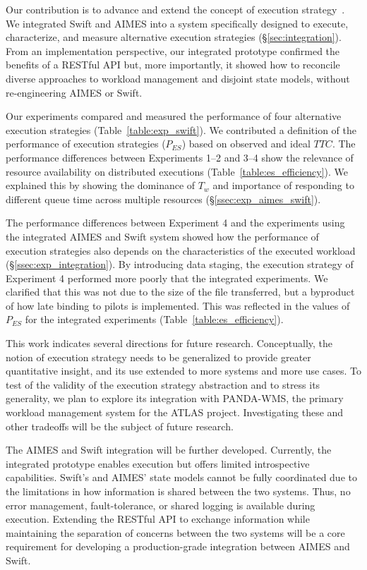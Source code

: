 \documentclass[10pt, conference, compsocconf]{IEEEtran}
\begin{document}
Our contribution is to advance and extend the concept of execution
strategy~\cite{turilli2016integrating}.  We integrated Swift and AIMES into a
system specifically designed to execute, characterize, and measure
alternative execution strategies (\S\ref{sec:integration}). From an
implementation perspective, our integrated prototype confirmed the benefits
of a RESTful API but, more importantly, it showed how to reconcile diverse
approaches to workload management and disjoint state models, without
re-engineering AIMES or Swift.

Our experiments compared and measured the performance of four alternative
execution strategies (Table~\ref{table:exp_swift}). We contributed a
definition of the performance of execution strategies (\(P_{ES}\)) based on
observed and ideal \(TTC\). The performance differences between Experiments
1--2 and 3--4 show the relevance of resource availability on distributed
executions (Table~\ref{table:es_efficiency}).  We explained this by showing
the dominance of \(T_w\) and importance of responding to different queue time
across multiple resources (\S\ref{ssec:exp_aimes_swift}).

The performance differences between Experiment 4 and the experiments using
the integrated AIMES and Swift system showed how the performance of execution
strategies also depends on the characteristics of the executed workload
(\S\ref{ssec:exp_integration}). By introducing data staging, the execution
strategy of Experiment 4 performed more poorly that the integrated
experiments. We clarified that this was not due to the size of the file
transferred, but a byproduct of how late binding to pilots is implemented.
This was reflected in the values of \(P_{ES}\) for the integrated experiments
(Table~\ref{table:es_efficiency}).

This work indicates several directions for future research. Conceptually, the
notion of execution strategy needs to be generalized to provide greater
quantitative insight, and its use extended to more systems and more use
cases.  To test of the validity of the execution strategy abstraction and to
stress its generality, we plan to explore its integration with PANDA-WMS, the
primary workload management system for the ATLAS project. Investigating these
and other tradeoffs will be the subject of future research.

The AIMES and Swift integration will be further developed.  Currently, the
integrated prototype enables execution but offers limited introspective
capabilities. Swift's and AIMES' state models cannot be fully coordinated due
to the limitations in how information is shared between the two systems.
Thus, no error management, fault-tolerance, or shared logging is available
during execution. Extending the RESTful API to exchange information while
maintaining the separation of concerns between the two systems will be a core
requirement for developing a production-grade integration between AIMES and
Swift.
\end{document}
